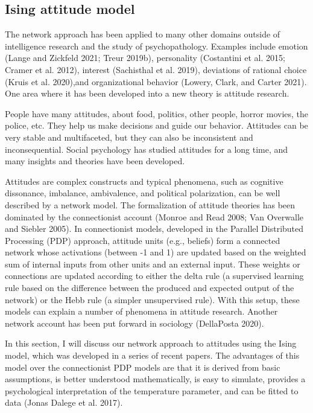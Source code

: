 \documentclass[
  a4paper,
  DIV=11,
  numbers=noendperiod,
  oneside]{scrreprt}
\begin{document}
\hypertarget{sec-Ising-attitude-model}{%
\subsection{Ising attitude model}\label{sec-Ising-attitude-model}}

The network approach has been applied to many other domains outside of
intelligence research and the study of psychopathology. Examples include
emotion (Lange and Zickfeld 2021; Treur 2019b), personality (Costantini
et al. 2015; Cramer et al. 2012), interest (Sachisthal et al. 2019),
deviations of rational choice (Kruis et al. 2020),and organizational
behavior (Lowery, Clark, and Carter 2021). One area where it has been
developed into a new theory is attitude research.

People have many attitudes, about food, politics, other people, horror
movies, the police, etc. They help us make decisions and guide our
behavior. Attitudes can be very stable and multifaceted, but they can
also be inconsistent and inconsequential. Social psychology has studied
attitudes for a long time, and many insights and theories have been
developed.

Attitudes are complex constructs and typical phenomena, such as
cognitive dissonance, imbalance, ambivalence, and political
polarization, can be well described by a network model. The
formalization of attitude theories has been dominated by the
connectionist account (Monroe and Read 2008; Van Overwalle and Siebler
2005). In connectionist models, developed in the Parallel Distributed
Processing (PDP) approach, attitude units (e.g., beliefs) form a
connected network whose activations (between -1 and 1) are updated based
on the weighted sum of internal inputs from other units and an external
input. These weights or connections are updated according to either the
delta rule (a supervised learning rule based on the difference between
the produced and expected output of the network) or the Hebb rule (a
simpler unsupervised rule). With this setup, these models can explain a
number of phenomena in attitude research. Another network account has
been put forward in sociology (DellaPosta 2020).

In this section, I will discuss our network approach to attitudes using
the Ising model, which was developed in a series of recent papers. The
advantages of this model over the connectionist PDP models are that it
is derived from basic assumptions, is better understood mathematically,
is easy to simulate, provides a psychological interpretation of the
temperature parameter, and can be fitted to data (Jonas Dalege et al.
2017).
\end{document}
